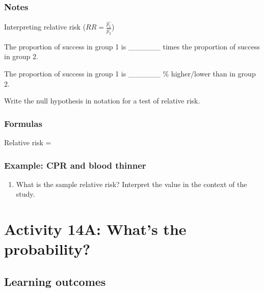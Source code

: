 \documentclass[
]{report}
\providecommand{\tightlist}{%
  \setlength{\itemsep}{0pt}\setlength{\parskip}{0pt}}
\newcommand{\rgs}{\vspace{12pt}} %
\newcommand{\rgi}{\hspace{24pt}}  %
\begin{document}
\hypertarget{notes-26}{%
\subsubsection*{Notes}\label{notes-26}}

Interpreting relative risk (\(RR = \frac{\hat{p_1}}{\hat{p_2}}\))

\rgi The proportion of success in group 1 is \_\_\_\_\_\_ times the proportion of success in group 2.

\rgi The proportion of success in group 1 is \_\_\_\_\_\_ \% higher/lower than in group 2.

Write the null hypothesis in notation for a test of relative risk.
\rgs

\hypertarget{formulas-8}{%
\subsubsection*{Formulas}\label{formulas-8}}

Relative risk =
\rgs

\hypertarget{example-cpr-and-blood-thinner-2}{%
\subsubsection*{Example: CPR and blood thinner}\label{example-cpr-and-blood-thinner-2}}

\begin{enumerate}
\def\labelenumi{\arabic{enumi}.}
\tightlist
\item
  What is the sample relative risk? Interpret the value in the context of the study.
  \rgs
  \rgs
\end{enumerate}

\newpage

\hypertarget{activity-14a-whats-the-probability}{%
\section{Activity 14A: What's the probability?}\label{activity-14a-whats-the-probability}}


\hypertarget{learning-outcomes-28}{%
\subsection{Learning outcomes}\label{learning-outcomes-28}}
\end{document}

